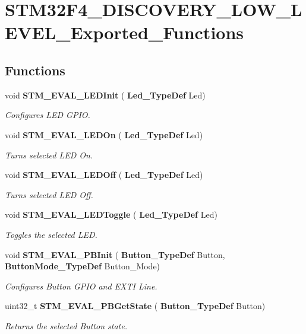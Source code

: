 \section{S\+T\+M32\+F4\+\_\+\+D\+I\+S\+C\+O\+V\+E\+R\+Y\+\_\+\+L\+O\+W\+\_\+\+L\+E\+V\+E\+L\+\_\+\+Exported\+\_\+\+Functions}
\label{group__STM32F4__DISCOVERY__LOW__LEVEL__Exported__Functions}
\subsection*{Functions}
\begin{DoxyCompactItemize}
\item 
void \textbf{ S\+T\+M\+\_\+\+E\+V\+A\+L\+\_\+\+L\+E\+D\+Init} (\textbf{ Led\+\_\+\+Type\+Def} Led)
\begin{DoxyCompactList}\small\item\em Configures L\+ED G\+P\+IO. \end{DoxyCompactList}\item 
void \textbf{ S\+T\+M\+\_\+\+E\+V\+A\+L\+\_\+\+L\+E\+D\+On} (\textbf{ Led\+\_\+\+Type\+Def} Led)
\begin{DoxyCompactList}\small\item\em Turns selected L\+ED On. \end{DoxyCompactList}\item 
void \textbf{ S\+T\+M\+\_\+\+E\+V\+A\+L\+\_\+\+L\+E\+D\+Off} (\textbf{ Led\+\_\+\+Type\+Def} Led)
\begin{DoxyCompactList}\small\item\em Turns selected L\+ED Off. \end{DoxyCompactList}\item 
void \textbf{ S\+T\+M\+\_\+\+E\+V\+A\+L\+\_\+\+L\+E\+D\+Toggle} (\textbf{ Led\+\_\+\+Type\+Def} Led)
\begin{DoxyCompactList}\small\item\em Toggles the selected L\+ED. \end{DoxyCompactList}\item 
void \textbf{ S\+T\+M\+\_\+\+E\+V\+A\+L\+\_\+\+P\+B\+Init} (\textbf{ Button\+\_\+\+Type\+Def} Button, \textbf{ Button\+Mode\+\_\+\+Type\+Def} Button\+\_\+\+Mode)
\begin{DoxyCompactList}\small\item\em Configures Button G\+P\+IO and E\+X\+TI Line. \end{DoxyCompactList}\item 
uint32\+\_\+t \textbf{ S\+T\+M\+\_\+\+E\+V\+A\+L\+\_\+\+P\+B\+Get\+State} (\textbf{ Button\+\_\+\+Type\+Def} Button)
\begin{DoxyCompactList}\small\item\em Returns the selected Button state. \end{DoxyCompactList}\end{DoxyCompactItemize}


